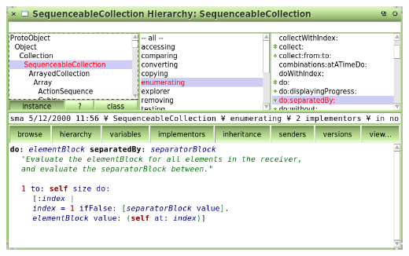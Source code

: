 \documentclass[notumble]{leaflet}
\begin{document}
\pagebreak{}

\subsection{\stMessageSendingTerm}

\stMessageSendingDefinition

\paragraph{\stUnaryMessagesTerm}

\stUnaryMessagesDefinition

\paragraph{\stBinaryMessagesTerm}

\stBinaryMessagesDefinition

\paragraph{\stKeywordMessagesTerm}

\stKeywordMessagesDefinition

\pagebreak{}

\section{\stDevelopmentEnvironmentTerm}

\stDevelopmentEnvironmentDefinition

\begin{center}
  \includegraphics[width=.75\textwidth]{squeak}\\
  \stSqueakCodeBrowserTerm
\end{center}

\section{\stImplementationTerm}
\end{document}
